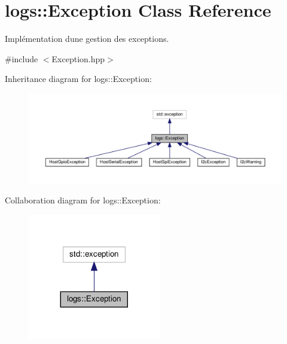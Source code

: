 \hypertarget{classlogs_1_1Exception}{}\section{logs\+:\+:Exception Class Reference}
\label{classlogs_1_1Exception}


Implémentation d\textquotesingle{}une gestion des exceptions.  




{\ttfamily \#include $<$Exception.\+hpp$>$}



Inheritance diagram for logs\+:\+:Exception\+:
\nopagebreak
\begin{figure}[H]
\begin{center}
\leavevmode
\includegraphics[width=350pt]{classlogs_1_1Exception__inherit__graph}
\end{center}
\end{figure}


Collaboration diagram for logs\+:\+:Exception\+:
\nopagebreak
\begin{figure}[H]
\begin{center}
\leavevmode
\includegraphics[width=164pt]{classlogs_1_1Exception__coll__graph}
\end{center}
\end{figure}
